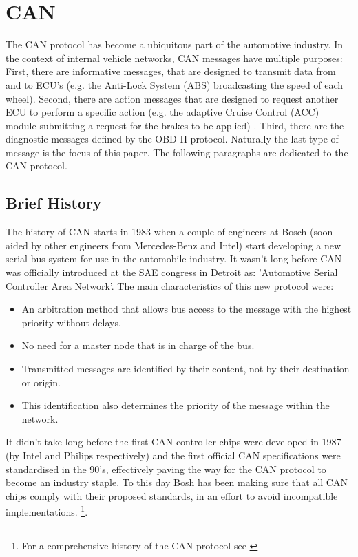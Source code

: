 \section{CAN}
\label{sec:can}

The CAN protocol has become a ubiquitous part of the automotive industry. In the context of internal vehicle networks, CAN messages have multiple purposes: First, there are informative messages, that are designed to transmit data from and to ECU's (e.g. the Anti-Lock System (ABS) broadcasting the speed of each wheel). Second, there are action messages that are designed to request another ECU to perform a specific action (e.g. the adaptive Cruise Control (ACC) module submitting a request for the brakes to be applied) \cite{CANhistory}. Third, there are the diagnostic messages defined by the OBD-II protocol. Naturally the last type of message is the focus of this paper. The following paragraphs are dedicated to the CAN protocol.

\subsection{Brief History} 
\label{subsec:can:briefhistory}

The history of CAN starts in 1983 when a couple of engineers at Bosch (soon aided by other engineers from Mercedes-Benz and Intel) start developing a new serial bus system for use in the automobile industry. It wasn't long before CAN was officially introduced at the SAE congress in Detroit as: 'Automotive Serial Controller Area Network'. The main characteristics of this new protocol were: 

\begin{itemize}
	\item An arbitration method that allows bus access to the message with the highest priority without delays.
	\item No need for a master node that is in charge of the bus.
	\item Transmitted messages are identified by their content, not by their destination or origin.
	\item This identification also determines the priority of the message within the network.
\end{itemize}

It didn't take long before the first CAN controller chips were developed in 1987 (by Intel and Philips respectively) and the first official CAN specifications were standardised in the 90's, effectively paving the way for the CAN protocol to become an industry staple. To this day Bosh has been making sure that all CAN chips comply with their proposed standards, in an effort to avoid incompatible implementations. \footnote{For a comprehensive history of the CAN protocol see \cite{CANhistory}}.

